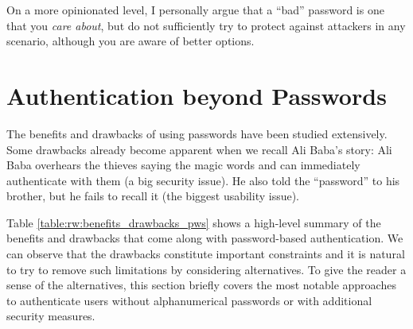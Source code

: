 On a more opinionated level, I personally argue that a ``bad'' password is one that you \textit{care about}, but do not sufficiently try to protect against attackers in any scenario, although you are aware of better options. 

\section{Authentication beyond Passwords}\label{sec:rw:authentication_without_pws}
The benefits and drawbacks of using passwords have been studied extensively. Some drawbacks already become apparent when we recall Ali Baba's story: Ali Baba overhears the thieves saying the magic words and can immediately authenticate with them (a big security issue). He also told the ``password'' to his brother, but he fails to recall it (the biggest usability issue).

Table \ref{table:rw:benefits_drawbacks_pws} shows a high-level summary of the benefits and drawbacks that come along with password-based authentication. We can observe that the drawbacks constitute important constraints and it is natural to try to remove such limitations by considering alternatives. To give the reader a sense of the alternatives, this section briefly covers the most notable approaches to authenticate users without alphanumerical passwords or with additional security measures. 

